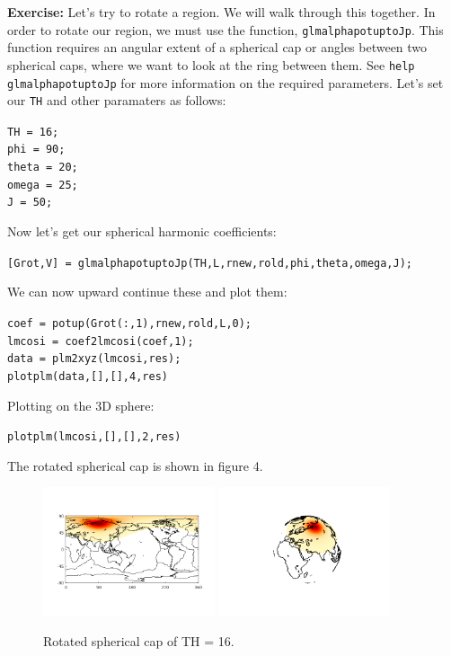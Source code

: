 \documentclass[11pt]{article}
\begin{document}
\textbf{Exercise:} Let's try to rotate a region.  We will walk through this together.  In order to rotate our region, we must use the function, \verb|glmalphapotuptoJp|.  This function requires an angular extent of a spherical cap or angles between two spherical caps, where we want to look at the ring between them.  See \verb|help glmalphapotuptoJp| for more information on the required parameters.  Let's set our \verb|TH| and other paramaters as follows:

\verb|TH = 16;|\\
\verb|phi = 90;|\\
\verb|theta = 20;|\\
\verb|omega = 25;|\\
\verb|J = 50;|

Now let's get our spherical harmonic coefficients:

\verb|[Grot,V] = glmalphapotuptoJp(TH,L,rnew,rold,phi,theta,omega,J);|

We can now upward continue these and plot them:

\verb|coef = potup(Grot(:,1),rnew,rold,L,0);|\\
\verb|lmcosi = coef2lmcosi(coef,1);|\\
\verb|data = plm2xyz(lmcosi,res);|\\
\verb|plotplm(data,[],[],4,res)|

Plotting on the 3D sphere:

\verb|plotplm(lmcosi,[],[],2,res)|

The rotated spherical cap is shown in figure 4.

\begin{figure}[H]
  \centering
  \includegraphics[width=0.45\textwidth]{figures/rot16flat.png}
  \includegraphics[width=0.45\textwidth]{figures/rot16.png}
  \caption{Rotated spherical cap of TH = 16.}
\label{Grot}
\end{figure}
\end{document}
